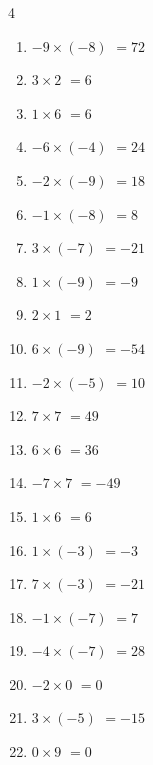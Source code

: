 \begin{multicols}{4}
\begin{enumerate}
  \item $-9\times (-8)$
        $=72$

  \item $3\times 2$
        $=6$

  \item $1\times 6$
        $=6$

  \item $-6\times (-4)$
        $=24$

  \item $-2\times (-9)$
        $=18$

\columnbreak %

\resetques

  \item $-1\times (-8)$
        $=8$

  \item $3\times (-7)$
        $=-21$

  \item $1\times (-9)$
        $=-9$

  \item $2\times 1$
        $=2$

  \item $6\times (-9)$
        $=-54$

  \item $-2\times (-5)$
        $=10$

  \item $7\times 7$
        $=49$

  \item $6\times 6$
        $=36$

  \item $-7\times 7$
        $=-49$

  \item $1\times 6$
        $=6$

  \item $1\times (-3)$
        $=-3$

  \item $7\times (-3)$
        $=-21$

  \item $-1\times (-7)$
        $=7$

  \item $-4\times (-7)$
        $=28$

  \item $-2\times 0$
        $=0$

  \item $3\times (-5)$
        $=-15$

  \item $0\times 9$
        $=0$


\end{enumerate}
\end{multicols}
